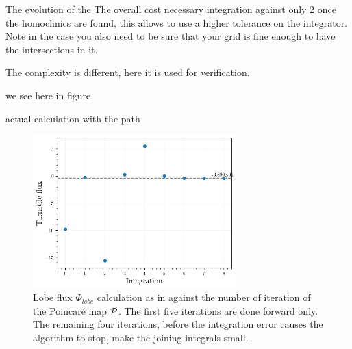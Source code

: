 The evolution of the 
The overall cost 
necessary integration against only 2 once the homoclinics are found, this allows to use a higher tolerance on the integrator. Note in the case you also need to be sure that your grid is fine enough to have the intersections in it.

The complexity is different, here it is used for verification.

we see here in figure 

actual calculation with the path 

\begin{figure}[H]
    \centering
    \includegraphics[width=0.7\textwidth]{images/turnstile/turnstile_area_final.png}
    \caption{Lobe flux $\Phi_{lobe}$ calculation as in  against the number of iteration of the Poincaré map $\mathcal{P}$. The first five iterations are done forward only. The remaining four iterations, before the integration error causes the algorithm to stop, make the joining integrals small.}
    \label{fig:turnstile-convergence}
\end{figure}

